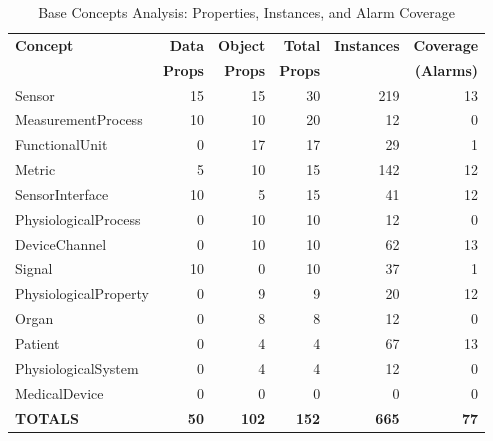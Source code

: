\begin{table}[htbp]
\centering
\caption{Base Concepts Analysis: Properties, Instances, and Alarm Coverage}
\label{tab:base_concepts}
\begin{tabular}{|l|r|r|r|r|r|}
\hline
\textbf{Concept} & \textbf{Data} & \textbf{Object} & \textbf{Total} & \textbf{Instances} & \textbf{Coverage} \\
& \textbf{Props} & \textbf{Props} & \textbf{Props} & & \textbf{(Alarms)} \\
\hline
Sensor & 15 & 15 & 30 & 219 & 13 \\
MeasurementProcess & 10 & 10 & 20 & 12 & 0 \\
FunctionalUnit & 0 & 17 & 17 & 29 & 1 \\
Metric & 5 & 10 & 15 & 142 & 12 \\
SensorInterface & 10 & 5 & 15 & 41 & 12 \\
PhysiologicalProcess & 0 & 10 & 10 & 12 & 0 \\
DeviceChannel & 0 & 10 & 10 & 62 & 13 \\
Signal & 10 & 0 & 10 & 37 & 1 \\
PhysiologicalProperty & 0 & 9 & 9 & 20 & 12 \\
Organ & 0 & 8 & 8 & 12 & 0 \\
Patient & 0 & 4 & 4 & 67 & 13 \\
PhysiologicalSystem & 0 & 4 & 4 & 12 & 0 \\
MedicalDevice & 0 & 0 & 0 & 0 & 0 \\
\hline
\textbf{TOTALS} & \textbf{50} & \textbf{102} & \textbf{152} & \textbf{665} & \textbf{77} \\
\hline
\end{tabular}
\end{table}